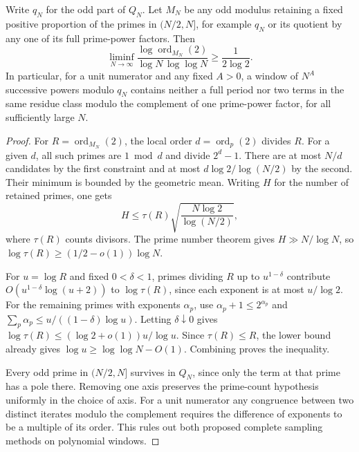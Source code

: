 \documentclass[11pt]{article}
\DeclareMathOperator{\ord}{ord}
\begin{document}
\begin{theorem}\label{th:taylororder}
Write $q_N$ for the odd part of $Q_N$. Let $M_N$ be any odd modulus retaining a fixed positive proportion of the primes in $(N/2,N]$, for example $q_N$ or its quotient by any one of its full prime-power factors. Then
\[
 \liminf_{N\to\infty}\frac{\log\ord_{M_N}(2)}{\log N\,\log\log N}
 \ge\frac1{2\log 2}.
\]
In particular, for a unit numerator and any fixed $A>0$, a window of $N^A$ successive powers modulo $q_N$ contains neither a full period nor two terms in the same residue class modulo the complement of one prime-power factor, for all sufficiently large $N$.
\end{theorem}
\begin{proof}
For $R=\ord_{M_N}(2)$, the local order $d=\ord_p(2)$ divides $R$. For a given $d$, all such primes are $1\bmod d$ and divide $2^d-1$. There are at most $N/d$ candidates by the first constraint and at most $d\log 2/\log(N/2)$ by the second. Their minimum is bounded by the geometric mean. Writing $H$ for the number of retained primes, one gets
\[
 H\le \tau(R)\sqrt{\frac{N\log2}{\log(N/2)}} ,
\]
where $\tau(R)$ counts divisors. The prime number theorem gives $H\gg N/\log N$, so $\log\tau(R)\ge(1/2-o(1))\log N$.

For $u=\log R$ and fixed $0<\delta<1$, primes dividing $R$ up to $u^{1-\delta}$ contribute $O(u^{1-\delta}\log(u+2))$ to $\log\tau(R)$, since each exponent is at most $u/\log2$. For the remaining primes with exponents $\alpha_p$, use $\alpha_p+1\le2^{\alpha_p}$ and $\sum_p\alpha_p\le u/((1-\delta)\log u)$. Letting $\delta\downarrow0$ gives $\log\tau(R)\le(\log2+o(1))u/\log u$. Since $\tau(R)\le R$, the lower bound already gives $\log u\ge\log\log N-O(1)$. Combining proves the inequality.

Every odd prime in $(N/2,N]$ survives in $Q_N$, since only the term at that prime has a pole there. Removing one axis preserves the prime-count hypothesis uniformly in the choice of axis. For a unit numerator any congruence between two distinct iterates modulo the complement requires the difference of exponents to be a multiple of its order. This rules out both proposed complete sampling methods on polynomial windows.
\end{proof}
\end{document}
